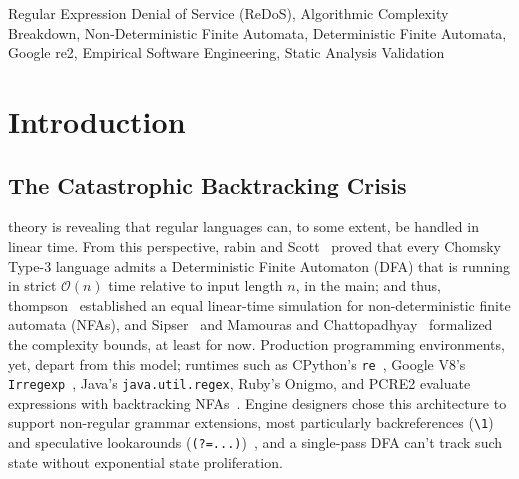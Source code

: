 \documentclass{ieeeaccess}
\begin{document}
\begin{abstract}
regression approach applied by ReDoS-Guard; and thus, a baseline precision of 87.67\% is pulled off by (4) Static abstract syntax tree (AST) analyzers but display a false discovery rate of 47.17\% (a false positive rate of 7.19\%).
\end{abstract}

\begin{keywords}
Regular Expression Denial of Service (ReDoS), Algorithmic Complexity Breakdown, Non-Deterministic Finite Automata, Deterministic Finite Automata, Google re2, Empirical Software Engineering, Static Analysis Validation
\end{keywords}

\titlepgskip=-15pt

\maketitle

\section{Introduction}

\subsection{The Catastrophic Backtracking Crisis}
 theory is revealing that regular languages can, to some extent, be handled in linear time. From this perspective, rabin and Scott~\cite{rabin1959finite} proved that every Chomsky Type-3 language admits a Deterministic Finite Automaton (DFA) that is running in strict $\mathcal{O}(n)$ time relative to input length $n$, in the main; and thus, thompson~\cite{thompson1968regular} established an equal linear-time simulation for non-deterministic finite automata (NFAs), and Sipser~\cite{sipser2012introduction} and Mamouras and Chattopadhyay~\cite{mamouras2024efficient} formalized the complexity bounds, at least for now. Production programming environments, yet, depart from this model; runtimes such as CPython's \texttt{re}~\cite{cpython_sre}, Google V8's \texttt{Irregexp}~\cite{v8_irregexp}, Java's \texttt{java.util.regex}, Ruby's Onigmo, and PCRE2 evaluate expressions with backtracking NFAs~\cite{cox2007regular,cox2010regular}. Engine designers chose this architecture to support non-regular grammar extensions, most particularly backreferences (\texttt{\textbackslash 1}) and speculative lookarounds (\texttt{(?=...)})~\cite{aho1990algorithms,hopcroft2006introduction,aho2006compilers}, and a single-pass DFA can't track such state without exponential state proliferation.
\end{document}
